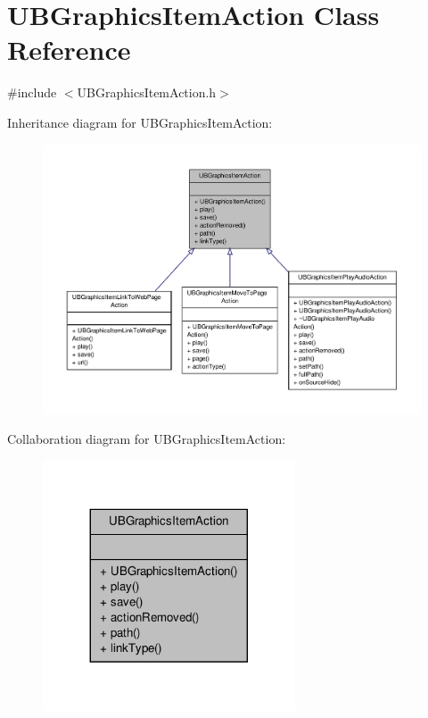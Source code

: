 \hypertarget{class_u_b_graphics_item_action}{\section{U\-B\-Graphics\-Item\-Action Class Reference}
\label{dd/dfb/class_u_b_graphics_item_action}
}


{\ttfamily \#include $<$U\-B\-Graphics\-Item\-Action.\-h$>$}



Inheritance diagram for U\-B\-Graphics\-Item\-Action\-:
\nopagebreak
\begin{figure}[H]
\begin{center}
\leavevmode
\includegraphics[width=350pt]{d4/dcd/class_u_b_graphics_item_action__inherit__graph}
\end{center}
\end{figure}


Collaboration diagram for U\-B\-Graphics\-Item\-Action\-:
\nopagebreak
\begin{figure}[H]
\begin{center}
\leavevmode
\includegraphics[width=212pt]{d4/df5/class_u_b_graphics_item_action__coll__graph}
\end{center}
\end{figure}

